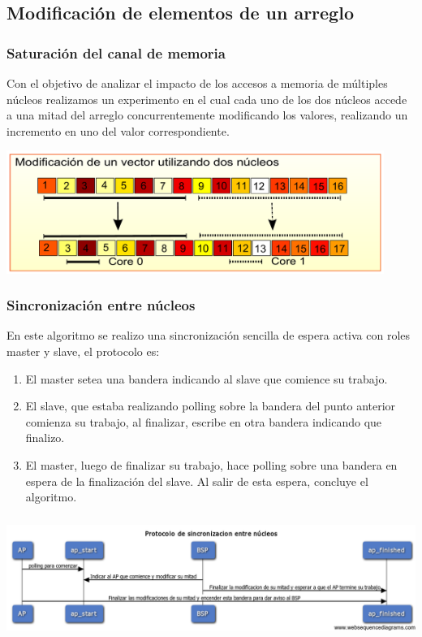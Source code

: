  \subsection{Modificación de elementos de un arreglo}
	\subsubsection{Saturación del canal de memoria}
		Con el objetivo de analizar el impacto de los accesos a memoria de múltiples núcleos realizamos un experimento en el cual cada uno de los dos núcleos accede a una mitad del arreglo concurrentemente modificando los valores, realizando un incremento en uno del valor correspondiente.
		
	\begin{center}
 	    \includegraphics[height=4cm]{images/dualcore-vectorsum.pdf}
    \end{center}

	\subsubsection{Sincronización entre núcleos}
		En este algoritmo se realizo una sincronización sencilla de espera activa con roles master y slave, el protocolo es:
		\begin{enumerate}
			\item El master setea una bandera indicando al slave que comience su trabajo.
			\item El slave, que estaba realizando polling sobre la bandera del punto anterior comienza su trabajo, al finalizar, escribe en otra bandera indicando que finalizo.
			\item El master, luego de finalizar su trabajo, hace polling sobre una bandera en espera de la finalización del slave. Al salir de esta espera, concluye el algoritmo.
		\end{enumerate}
		
		\begin{center}
 	       \includegraphics[height=4cm]{images/sync-vectorsum-seq.png}
    	\end{center}
